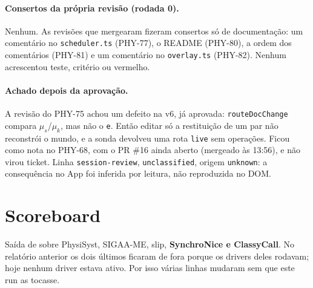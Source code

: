\documentclass[11pt,a4paper]{article}
\begin{document}
\paragraph{Consertos da própria revisão (rodada 0).} Nenhum. As revisões que
mergearam fizeram consertos só de documentação: um comentário no
\texttt{scheduler.ts} (PHY-77), o README (PHY-80), a ordem dos comentários
(PHY-81) e um comentário no \texttt{overlay.ts} (PHY-82). Nenhum acrescentou
teste, critério ou vermelho.

\paragraph{Achado depois da aprovação.} A revisão do PHY-75 achou um defeito na
v6, já aprovada: \texttt{routeDocChange} compara $\mu_s$/$\mu_k$, mas não o
\texttt{e}. Então editar só a restituição de um par não reconstrói o mundo, e a
sonda devolveu uma rota \texttt{live} sem operações. Ficou como nota no PHY-68,
com o PR \#16 ainda aberto (mergeado às 13:56), e não virou ticket. Linha
\texttt{session-review}, \texttt{unclassified}, origem \texttt{unknown}: a
consequência no App foi inferida por leitura, não reproduzida no DOM.

\section{Scoreboard}

Saída de  sobre PhysiSyst, SIGAA-ME,
slip, \textbf{SynchroNice e ClassyCall}. No relatório anterior os dois últimos
ficaram de fora porque os drivers deles rodavam; hoje nenhum driver estava
ativo. Por isso várias linhas mudaram sem que este run as tocasse.
\end{document}
